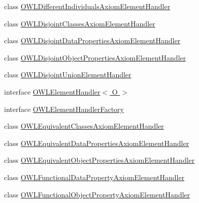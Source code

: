 \begin{DoxyCompactItemize}
\item 
class \hyperlink{classorg_1_1coode_1_1owlapi_1_1owlxmlparser_1_1_o_w_l_different_individuals_axiom_element_handler}{O\-W\-L\-Different\-Individuals\-Axiom\-Element\-Handler}
\item 
class \hyperlink{classorg_1_1coode_1_1owlapi_1_1owlxmlparser_1_1_o_w_l_disjoint_classes_axiom_element_handler}{O\-W\-L\-Disjoint\-Classes\-Axiom\-Element\-Handler}
\item 
class \hyperlink{classorg_1_1coode_1_1owlapi_1_1owlxmlparser_1_1_o_w_l_disjoint_data_properties_axiom_element_handler}{O\-W\-L\-Disjoint\-Data\-Properties\-Axiom\-Element\-Handler}
\item 
class \hyperlink{classorg_1_1coode_1_1owlapi_1_1owlxmlparser_1_1_o_w_l_disjoint_object_properties_axiom_element_handler}{O\-W\-L\-Disjoint\-Object\-Properties\-Axiom\-Element\-Handler}
\item 
class \hyperlink{classorg_1_1coode_1_1owlapi_1_1owlxmlparser_1_1_o_w_l_disjoint_union_element_handler}{O\-W\-L\-Disjoint\-Union\-Element\-Handler}
\item 
interface \hyperlink{interfaceorg_1_1coode_1_1owlapi_1_1owlxmlparser_1_1_o_w_l_element_handler_3_01_o_01_4}{O\-W\-L\-Element\-Handler$<$ O $>$}
\item 
interface \hyperlink{interfaceorg_1_1coode_1_1owlapi_1_1owlxmlparser_1_1_o_w_l_element_handler_factory}{O\-W\-L\-Element\-Handler\-Factory}
\item 
class \hyperlink{classorg_1_1coode_1_1owlapi_1_1owlxmlparser_1_1_o_w_l_equivalent_classes_axiom_element_handler}{O\-W\-L\-Equivalent\-Classes\-Axiom\-Element\-Handler}
\item 
class \hyperlink{classorg_1_1coode_1_1owlapi_1_1owlxmlparser_1_1_o_w_l_equivalent_data_properties_axiom_element_handler}{O\-W\-L\-Equivalent\-Data\-Properties\-Axiom\-Element\-Handler}
\item 
class \hyperlink{classorg_1_1coode_1_1owlapi_1_1owlxmlparser_1_1_o_w_l_equivalent_object_properties_axiom_element_handler}{O\-W\-L\-Equivalent\-Object\-Properties\-Axiom\-Element\-Handler}
\item 
class \hyperlink{classorg_1_1coode_1_1owlapi_1_1owlxmlparser_1_1_o_w_l_functional_data_property_axiom_element_handler}{O\-W\-L\-Functional\-Data\-Property\-Axiom\-Element\-Handler}
\item 
class \hyperlink{classorg_1_1coode_1_1owlapi_1_1owlxmlparser_1_1_o_w_l_functional_object_property_axiom_element_handler}{O\-W\-L\-Functional\-Object\-Property\-Axiom\-Element\-Handler}

\end{DoxyCompactItemize}
